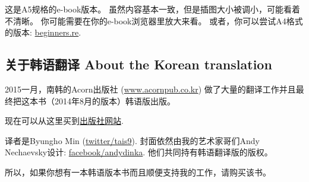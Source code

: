 \documentclass[UTF8,nofonts]{ctexart}
\begin{document}




\ifdefined\ebook
这是A5规格的e-book版本。
虽然内容基本一致，但是插图大小被调小，可能看着不清晰。
你可能需要在你的e-book浏览器里放大来看。
或者，你可以尝试A4格式的版本:
\href{http://go.yurichev.com/17009}{beginners.re}.
\fi

\subsection*{关于韩语翻译 About the Korean translation}

2015一月，南韩的Acorn出版社 (\href{http://www.acornpub.co.kr}{www.acornpub.co.kr}) 做了大量的翻译工作并且最终把这本书（2014年8月的版本）韩语版出版。

现在可以从这里买到\href{http://go.yurichev.com/17343}{出版社网站}.

\iffalse
\begin{figure}[H]
\centering
\texttt{[image: acorn\_cover.jpg]}
\end{figure}
\fi

译者是Byungho Min (\href{http://go.yurichev.com/17344}{twitter/tais9}).
封面依然由我的艺术家哥们Andy Nechaevsky设计:
\href{http://go.yurichev.com/17023}{facebook/andydinka}.
他们共同持有韩语翻译版的版权。

所以，如果你想有一本韩语版本书而且顺便支持我的工作，请购买该书。
\end{document}
